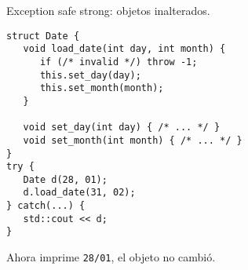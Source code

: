 \begin{frame}[fragile]{Exception safe strong: objetos inalterados.}
   \begin{lstlisting}[style=normal]
struct Date {
   void load_date(int day, int month) {
      if (/* invalid */) throw -1;
      this.set_day(day);
      this.set_month(month);
   }

   void set_day(int day) { /* ... */ }
   void set_month(int month) { /* ... */ }
}
try {
   Date d(28, 01);
   d.load_date(31, 02);
} catch(...) {
   std::cout << d;
}
   \end{lstlisting}
Ahora imprime \lstinline[style=normal]!28/01!, el objeto \alert{no cambi\'o}.
\end{frame}

